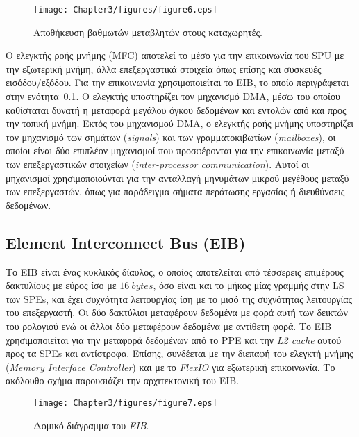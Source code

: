 \begin{figure}
\centering
\texttt{[image: Chapter3/figures/figure6.eps]}
\caption{Αποθήκευση βαθμωτών μεταβλητών στους καταχωρητές.}
\label{figure:fig36}
\end{figure}

\indent
Ο ελεγκτής ροής μνήμης (\ac{MFC}) αποτελεί το μέσο για την επικοινωνία του \ac{SPU} με την εξωτερική μνήμη, άλλα επεξεργαστικά στοιχεία όπως επίσης και συσκευές εισόδου/εξόδου. Για την επικοινωνία χρησιμοποιείται το \acf{EIB}, το οποίο περιγράφεται στην ενότητα~\ref{subsection:sub323}. Ο ελεγκτής υποστηρίζει τον μηχανισμό \ac{DMA}, μέσω του οποίου καθίσταται δυνατή η μεταφορά μεγάλου όγκου δεδομένων και εντολών από και προς την τοπική μνήμη. Εκτός του μηχανισμού \ac{DMA}, ο ελεγκτής ροής μνήμης υποστηρίζει τον μηχανισμό των σημάτων (\textsl{signals}) και των γραμματοκιβωτίων (\textsl{mailboxes}), οι οποίοι είναι δύο επιπλέον μηχανισμοί που προσφέρονται για την επικοινωνία μεταξύ των επεξεργαστικών στοιχείων (\textsl{inter-processor communication}). Αυτοί οι μηχανισμοί χρησιμοποιούνται για την ανταλλαγή μηνυμάτων μικρού μεγέθους μεταξύ των επεξεργαστών, όπως για παράδειγμα σήματα περάτωσης εργασίας ή διευθύνσεις δεδομένων.

\subsection[3.2.3 Element Interconnect Bus (EIB)]{Element Interconnect Bus (EIB)}
\label{subsection:sub323}
\indent
Το \acf{EIB} είναι ένας κυκλικός δίαυλος, ο οποίος αποτελείται από τέσσερεις επιμέρους δακτυλίους με εύρος ίσο με \(16\ bytes\), όσο είναι και το μήκος μίας γραμμής στην \ac{LS} των \acp{SPE}, και έχει συχνότητα λειτουργίας ίση με το μισό της συχνότητας λειτουργίας του επεξεργαστή. Οι δύο δακτύλιοι μεταφέρουν δεδομένα με φορά αυτή των δεικτών του ρολογιού ενώ οι άλλοι δύο μεταφέρουν δεδομένα με αντίθετη φορά. Το \ac{EIB} χρησιμοποιείται για την μεταφορά δεδομένων από το \ac{PPE} και την \textsl{L2 cache} αυτού προς τα \acp{SPE} και αντίστροφα. Επίσης, συνδέεται με την διεπαφή του ελεγκτή μνήμης (\textsl{Memory Interface Controller}) και με το \textsl{FlexIO} για εξωτερική επικοινωνία. Το ακόλουθο σχήμα παρουσιάζει την αρχιτεκτονική του \ac{EIB}.

\begin{figure}
\centering
\texttt{[image: Chapter3/figures/figure7.eps]}
\caption{Δομικό διάγραμμα του \textsl{EIB}.}
\label{figure:fig37}
\end{figure}

